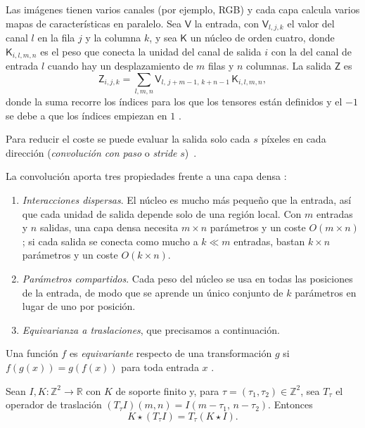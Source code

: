 Las imágenes tienen varios canales (por ejemplo, RGB) y cada capa calcula
varios mapas de características en paralelo. Sea $\mathsf{V}$ la entrada, con
$\mathsf{V}_{l,j,k}$ el valor del canal $l$ en la fila $j$ y la columna $k$,
y sea $\mathsf{K}$ un núcleo de orden cuatro, donde $\mathsf{K}_{i,l,m,n}$ es
el peso que conecta la unidad del canal de salida $i$ con la del canal de
entrada $l$ cuando hay un desplazamiento de $m$ filas y $n$ columnas. La
salida $\mathsf{Z}$ es
\begin{equation}\label{eq:conv-multicanal}
  \mathsf{Z}_{i,j,k} = \sum_{l,m,n}
  \mathsf{V}_{l,\, j+m-1,\, k+n-1}\, \mathsf{K}_{i,l,m,n},
\end{equation}
donde la suma recorre los índices para los que los tensores están definidos
y el $-1$ se debe a que los índices empiezan en $1$
\cite[sec.~9.5]{goodfellow2016deep}.

Para reducir el coste se puede evaluar la salida solo cada $s$ píxeles en
cada dirección (\emph{convolución con paso} o \emph{stride} $s$)~\cite[sec.~9.5]{goodfellow2016deep}.

La convolución aporta tres propiedades frente a una capa densa
\cite[sec.~9.2]{goodfellow2016deep}:
\begin{enumerate}
  \item \emph{Interacciones dispersas}. El núcleo es mucho más pequeño que la
        entrada, así que cada unidad de salida depende solo de una región
        local. Con $m$ entradas y $n$ salidas, una capa densa necesita
        $m \times n$ parámetros y un coste $O(m \times n)$; si cada salida
        se conecta como mucho a $k \ll m$ entradas, bastan $k \times n$
        parámetros y un coste $O(k \times n)$.
  \item \emph{Parámetros compartidos}. Cada peso del núcleo se usa en todas
        las posiciones de la entrada, de modo que se aprende un único
        conjunto de $k$ parámetros en lugar de uno por posición.
  \item \emph{Equivarianza a traslaciones}, que precisamos a continuación.
\end{enumerate}

\begin{definicion}[Equivarianza]\label{def:equivarianza}
Una función $f$ es \emph{equivariante} respecto de una transformación $g$ si
$f(g(x)) = g(f(x))$ para toda entrada $x$ \cite[sec.~9.2]{goodfellow2016deep}.
\end{definicion}

\begin{proposicion}
\label{prop:equivarianza-conv}
Sean $I, K \colon \mathbb{Z}^2 \to \mathbb{R}$ con $K$ de soporte finito y,
para $\tau = (\tau_1, \tau_2) \in \mathbb{Z}^2$, sea $T_\tau$ el operador de
traslación $(T_\tau I)(m,n) = I(m-\tau_1,\, n-\tau_2)$. Entonces
\[
  K \star (T_\tau I) = T_\tau (K \star I).
\]
\end{proposicion}

